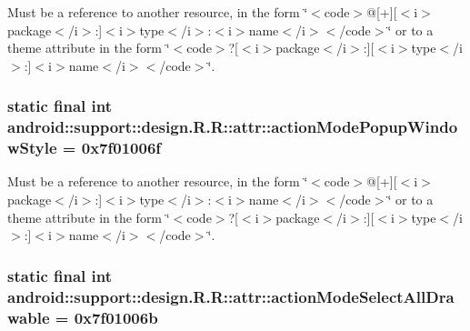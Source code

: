 Must be a reference to another resource, in the form \char`\"{}$<$code$>$@\mbox{[}+\mbox{]}\mbox{[}$<$i$>$package$<$/i$>$:\mbox{]}$<$i$>$type$<$/i$>$:$<$i$>$name$<$/i$>$$<$/code$>$\char`\"{} or to a theme attribute in the form \char`\"{}$<$code$>$?\mbox{[}$<$i$>$package$<$/i$>$:\mbox{]}\mbox{[}$<$i$>$type$<$/i$>$:\mbox{]}$<$i$>$name$<$/i$>$$<$/code$>$\char`\"{}. \hypertarget{classandroid_1_1support_1_1design_1_1_r_1_1attr_d1a38a2f7d27b045e68a1bda4d4cbd59}{
\subsubsection[{actionModePopupWindowStyle}]{\setlength{\rightskip}{0pt plus 5cm}static final int android::support::design.R.R::attr::actionModePopupWindowStyle = 0x7f01006f}}
\label{classandroid_1_1support_1_1design_1_1_r_1_1attr_d1a38a2f7d27b045e68a1bda4d4cbd59}


Must be a reference to another resource, in the form \char`\"{}$<$code$>$@\mbox{[}+\mbox{]}\mbox{[}$<$i$>$package$<$/i$>$:\mbox{]}$<$i$>$type$<$/i$>$:$<$i$>$name$<$/i$>$$<$/code$>$\char`\"{} or to a theme attribute in the form \char`\"{}$<$code$>$?\mbox{[}$<$i$>$package$<$/i$>$:\mbox{]}\mbox{[}$<$i$>$type$<$/i$>$:\mbox{]}$<$i$>$name$<$/i$>$$<$/code$>$\char`\"{}. \hypertarget{classandroid_1_1support_1_1design_1_1_r_1_1attr_bdf124bafcec610376733ad1c190acdb}{
\subsubsection[{actionModeSelectAllDrawable}]{\setlength{\rightskip}{0pt plus 5cm}static final int android::support::design.R.R::attr::actionModeSelectAllDrawable = 0x7f01006b}}
\label{classandroid_1_1support_1_1design_1_1_r_1_1attr_bdf124bafcec610376733ad1c190acdb}


